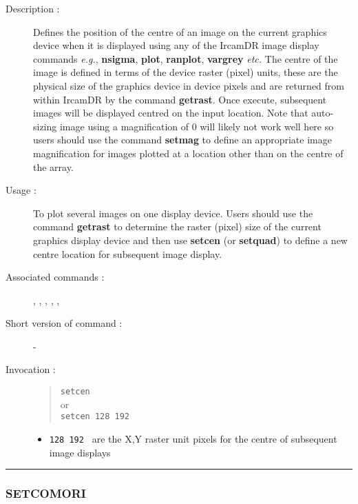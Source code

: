 \begin{description}

\item[Description :] Defines the position of the centre of an image on
the current graphics device when it is displayed using any of the {\sc
IrcamDR} image display commands \emph{e.g.}, {\bf nsigma}, {\bf plot},
{\bf ranplot}, {\bf vargrey} \emph{etc.}  The centre of the image is
defined in terms of the device raster (pixel) units, these are the
physical size of the graphics device in device pixels and are returned
from within {\sc IrcamDR} by the command {\bf getrast}.  Once execute,
subsequent images will be displayed centred on the input location.
Note that auto-sizing image using a magnification of 0 will likely not
work well here so users should use the command {\bf setmag} to define
an appropriate image magnification for images plotted at a location
other than on the centre of the array.

\item[Usage :] To plot several images on one display device.
Users should use the command {\bf getrast} to determine the raster (pixel)
size of the current graphics display device and then use {\bf setcen} (or
{\bf setquad}) to define a new centre location for subsequent image display.

\item[Associated commands :] {\tt {}},
{\tt {}}, {\tt {}},
{\tt {}}, {\tt {}},
{\tt {}}

\item[Short version of command :] -
\item[Invocation :]

\begin{quote}{\tt  setcen }\\
or \\
{\tt setcen 128 192 }
\end{quote}

\begin{itemize}

\item {\tt 128 192 } are the X,Y raster unit pixels for the centre of
 subsequent image displays
\end{itemize}

\end{description}

\hrule
\subsubsection*{\label{SETCOMORI}SETCOMORI}


